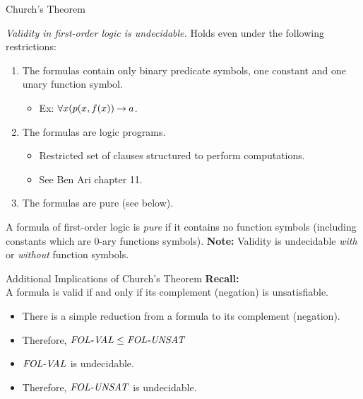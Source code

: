 \documentclass[style=sailor,size=12pt,mode=present]{powerdot}
\newcommand{\id}[1]{\mbox{\it #1\/}}
\theoremstyle{definition}
\newenvironment{defn}[1]
  {\renewcommand\theinnerdefn{#1}\innerdefn}
  {\endinnerdefn}
\newenvironment{thm}[1]
  {\renewcommand\theinnerthm{#1}\innerthm}
  {\endinnerthm}
\begin{document}
\begin{wideslide}[bm=,toc=]{Church's Theorem}
\begin{thm}{12.3}[Church]

\emph{Validity in first-order logic is undecidable.}
\end{thm}
Holds even under the following restrictions:
\begin{enumerate}
\item The formulas contain only binary predicate symbols, one constant and one
unary function symbol.
\begin{itemize}
\item Ex: $\forall x (p(x,f(x)) \mathbin{\rightarrow} a$.
\end{itemize}
\item The formulas are logic programs.
\begin{itemize}
\item Restricted set of clauses structured to perform computations.
\item See Ben Ari chapter 11.
\end{itemize}
\item The formulas are pure (see below).
\end{enumerate}
\vspace{-2ex}
\begin{defn}{12.4}[Ben Ari]
A formula of first-order logic is \emph{pure} if it contains no function symbols
(including constants which are 0-ary functions symbols).
\end{defn}
{\bf Note:} Validity is undecidable \emph{with} or \emph{without} function symbols.
\end{wideslide}

\begin{wideslide}[bm=,toc=]{Additional Implications of Church's Theorem}
{\bf Recall:}\\
A formula is valid if and only if its complement (negation) is unsatisfiable.
\begin{itemize}
\item There is a simple reduction from a formula to its complement (negation).
\item Therefore, $\id{FOL-VAL} \leq \id{FOL-UNSAT}$ 
\item $\id{FOL-VAL}$ is undecidable.
\item Therefore, $\id{FOL-UNSAT}$ is undecidable.
\end{itemize}
\end{wideslide}
\end{document}
